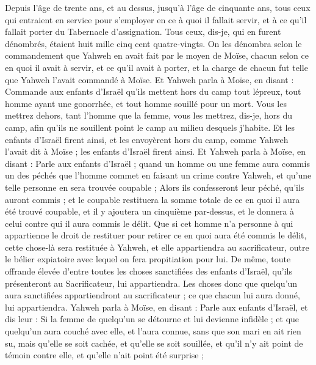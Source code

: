 \begin{multicols}{2}
Depuis l'âge de trente ans, et au dessus, jusqu'à l'âge de cinquante ans, tous ceux qui entraient en service pour s'employer en ce à quoi il fallait servir, et à ce qu'il fallait porter du Tabernacle d'assignation.
Tous ceux, dis-je, qui en furent dénombrés, étaient huit mille cinq cent quatre-vingts.
On les dénombra selon le commandement que Yahweh en avait fait par le moyen de Moïse, chacun selon ce en quoi il avait à servir, et ce qu'il avait à porter, et la charge de chacun fut telle que Yahweh l'avait commandé à Moïse.
\VerseOne{}Et Yahweh parla à Moïse, en disant :
Commande aux enfants d'Israël qu'ils mettent hors du camp tout lépreux, tout homme ayant une gonorrhée, et tout homme souillé pour un mort.
Vous les mettrez dehors, tant l'homme que la femme, vous les mettrez, dis-je, hors du camp, afin qu'ils ne souillent point le camp au milieu desquels j'habite.
Et les enfants d'Israël firent ainsi, et les envoyèrent hors du camp, comme Yahweh l'avait dit à Moïse ; les enfants d'Israël firent ainsi.
Et Yahweh parla à Moïse, en disant :
Parle aux enfants d'Israël ; quand un homme ou une femme aura commis un des péchés que l'homme commet en faisant un crime contre Yahweh, et qu'une telle personne en sera trouvée coupable ;
Alors ils confesseront leur péché, qu'ils auront commis ; et le coupable restituera la somme totale de ce en quoi il aura été trouvé coupable, et il y ajoutera un cinquième par-dessus, et le donnera à celui contre qui il aura commis le délit.
Que si cet homme n'a personne à qui appartienne le droit de restituer pour retirer ce en quoi aura été commis le délit, cette chose-là sera restituée à Yahweh, et elle appartiendra au sacrificateur, outre le bélier expiatoire avec lequel on fera propitiation pour lui.
De même, toute offrande élevée d'entre toutes les choses sanctifiées des enfants d'Israël, qu'ils présenteront au Sacrificateur, lui appartiendra.
 Les choses donc que quelqu'un aura sanctifiées appartiendront au sacrificateur ; ce que chacun lui aura donné, lui appartiendra.
Yahweh parla à Moïse, en disant :
Parle aux enfants d'Israël, et dis leur : Si la femme de quelqu'un se détourne et lui devienne infidèle ;
et que quelqu'un aura couché avec elle, et l'aura connue, sans que son mari en ait rien su, mais qu'elle se soit cachée, et qu'elle se soit souillée, et qu'il n'y ait point de témoin contre elle, et qu'elle n'ait point été surprise ;

\end{multicols}
